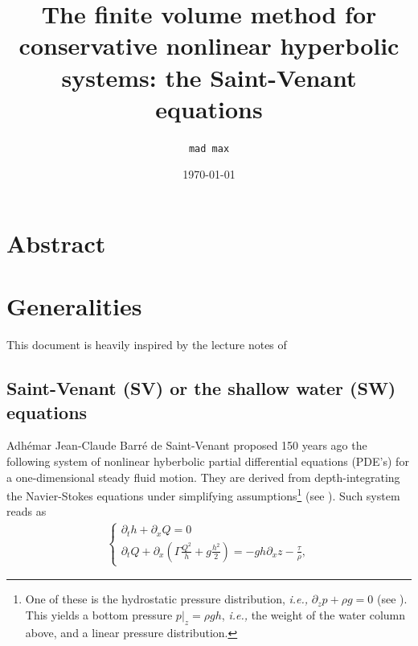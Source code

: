 \documentclass[a4paper]{article}
\numberwithin{equation}{section}
\newcommand{\ie}{\textit{i.e.,} }
\begin{document}
\title{The finite volume method for conservative nonlinear hyperbolic systems: the Saint-Venant equations}
\date{\today}
	\author{\texttt{mad max}}
	\maketitle
	\nocite{*}
	
	\section*{Abstract}
	
	\section{Generalities}
	This document is heavily inspired by the lecture notes of \cite{Lagree2022}
	\subsection{Saint-Venant (SV) or the shallow water (SW) equations}
	Adhémar Jean-Claude Barré de Saint-Venant proposed 150 years ago the following system of nonlinear hyberbolic partial differential equations (PDE's) for a one-dimensional steady fluid motion. They are derived from depth-integrating the Navier-Stokes equations under simplifying assumptions\footnote{One of these is the hydrostatic pressure distribution, \ie $\partial_zp + \rho g = 0$ (see \cite[pp. 22]{castro2019}). This yields a bottom pressure $p|_{z}=\rho g h$, \ie the weight of the water column above, and a linear pressure distribution.} (see \cite[pp. 35]{toro2013}). Such system reads as
	\begin{align}
		\label{StVenant}
		\begin{cases}
			\partial_t h + \partial_xQ = 0 \\
			\partial_t Q + \partial_x \left( \Gamma \frac{Q^2}{h}+g\frac{h^2}{2} \right) = -gh\partial_{x}z-\frac{\tau}{\rho} ,
		\end{cases}
	\end{align}
\end{document}

